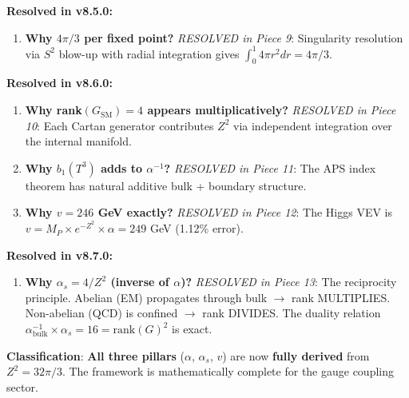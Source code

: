 \documentclass[12pt,a4paper]{article}
\newcommand{\Zsq}{Z^2}
\begin{document}
\begin{tcolorbox}[colback=yellow!10!white, colframe=orange!75!black, title=Derivation Gaps (v8.7.0 Update)]
\textbf{Resolved in v8.5.0:}
\begin{enumerate}[itemsep=0pt]
    \item[\checkmark] \textbf{Why $4\pi/3$ per fixed point?} \textit{RESOLVED in Piece 9}: Singularity resolution via $S^2$ blow-up with radial integration gives $\int_0^1 4\pi r^2 dr = 4\pi/3$.
\end{enumerate}

\textbf{Resolved in v8.6.0:}
\begin{enumerate}[itemsep=0pt]
    \item[\checkmark] \textbf{Why rank$(G_{\text{SM}}) = 4$ appears multiplicatively?} \textit{RESOLVED in Piece 10}: Each Cartan generator contributes $\Zsq$ via independent integration over the internal manifold.
    \item[\checkmark] \textbf{Why $b_1(T^3)$ adds to $\alpha^{-1}$?} \textit{RESOLVED in Piece 11}: The APS index theorem has natural additive bulk + boundary structure.
    \item[\checkmark] \textbf{Why $v = 246$ GeV exactly?} \textit{RESOLVED in Piece 12}: The Higgs VEV is $v = M_P \times e^{-\Zsq} \times \alpha = 249$ GeV (1.12\% error).
\end{enumerate}

\textbf{Resolved in v8.7.0:}
\begin{enumerate}[itemsep=0pt]
    \item[\checkmark] \textbf{Why $\alpha_s = 4/\Zsq$ (inverse of $\alpha$)?} \textit{RESOLVED in Piece 13}: The reciprocity principle. Abelian (EM) propagates through bulk $\to$ rank MULTIPLIES. Non-abelian (QCD) is confined $\to$ rank DIVIDES. The duality relation $\alpha^{-1}_{\text{bulk}} \times \alpha_s = 16 = \text{rank}(G)^2$ is exact.
\end{enumerate}

\textbf{Classification}: \textbf{All three pillars} ($\alpha$, $\alpha_s$, $v$) are now \textbf{fully derived} from $\Zsq = 32\pi/3$. The framework is mathematically complete for the gauge coupling sector.
\end{tcolorbox}
\end{document}
